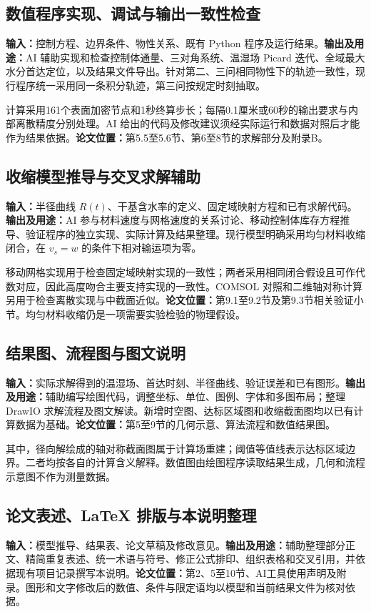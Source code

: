 \documentclass[UTF8,a4paper,12pt,fontset=windows]{ctexart}
\newcommand{\field}[1]{\textbf{#1：}}
\begin{document}
\newpage
\subsection{数值程序实现、调试与输出一致性检查}
\field{输入}控制方程、边界条件、物性关系、既有 Python 程序及运行结果。\field{输出及用途}AI 辅助实现和检查控制体通量、三对角系统、温湿场 Picard 迭代、全域最大水分首达定位，以及结果文件导出。针对第二、三问相同物性下的轨迹一致性，现行程序统一采用同一条积分轨迹，第三问按规定时刻抽取。

计算采用161个表面加密节点和1秒终算步长；每隔0.1厘米或60秒的输出要求与内部离散精度分别处理。AI 给出的代码及修改建议须经实际运行和数据对照后才能作为结果依据。\field{论文位置}第5.5至5.6节、第6至8节的求解部分及附录B。

\subsection{收缩模型推导与交叉求解辅助}
\field{输入}半径曲线 $R(t)$、干基含水率的定义、固定域映射方程和已有求解代码。\field{输出及用途}AI 参与材料速度与网格速度的关系讨论、移动控制体库存方程推导、验证程序的独立实现、实际计算及结果整理。现行模型明确采用均匀材料收缩闭合，在 $v_s=w$ 的条件下相对输运项为零。

移动网格实现用于检查固定域映射实现的一致性；两者采用相同闭合假设且可作代数对应，因此高度吻合主要支持实现的一致性。COMSOL 对照和二维轴对称计算另用于检查离散实现与中截面近似。\field{论文位置}第9.1至9.2节及第9.3节相关验证小节。均匀材料收缩仍是一项需要实验检验的物理假设。

\subsection{结果图、流程图与图文说明}
\field{输入}实际求解得到的温湿场、首达时刻、半径曲线、验证误差和已有图形。\field{输出及用途}辅助编写绘图代码，调整坐标、单位、图例、字体和多图布局；整理 DrawIO 求解流程及图文解读。新增时空图、达标区域图和收缩截面图均以已有计算数据为基础。\field{论文位置}第5至9节的几何示意、算法流程和数值结果图。

其中，径向解绘成的轴对称截面图属于计算场重建；阈值等值线表示达标区域边界。二者均按各自的计算含义解释。数值图由绘图程序读取结果生成，几何和流程示意图不作为测量数据。

\subsection{论文表述、LaTeX 排版与本说明整理}
\field{输入}模型推导、结果表、论文草稿及修改意见。\field{输出及用途}辅助整理部分正文、精简重复表述、统一术语与符号、修正公式排印、组织表格和交叉引用，并依据现有项目记录撰写本说明。\field{论文位置}第2、5至10节、AI工具使用声明及附录。图形和文字修改后的数值、条件与限定语均以模型和当前结果文件为核对依据。
\end{document}
